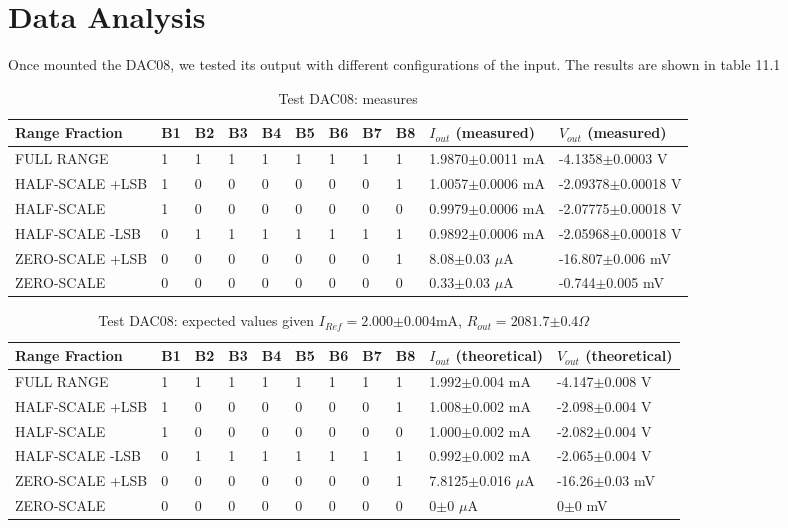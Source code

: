 \section{Data Analysis}
Once mounted the DAC08, we tested its output with different configurations of the input. The results are shown in table 11.1 \\

\begin{table}[H]
\centering
 \begin{tabular}{lllllllllll}
 \toprule
  Range Fraction & B1 & B2 & B3 & B4 & B5 & B6 & B7 & B8 & $I_{out}$ (measured) & $V_{out}$ (measured) \\
 \midrule
  FULL RANGE & 1 & 1 & 1 & 1 & 1 & 1 & 1 & 1 & 1.9870\(\pm\)0.0011 mA & -4.1358\(\pm\)0.0003 V \\
  HALF-SCALE +LSB & 1 & 0 & 0 & 0 & 0 & 0 & 0 & 1 & 1.0057\(\pm\)0.0006 mA & -2.09378\(\pm\)0.00018 V \\
  HALF-SCALE & 1 & 0 & 0 & 0 & 0 & 0 & 0 & 0 & 0.9979\(\pm\)0.0006 mA & -2.07775\(\pm\)0.00018 V \\
  HALF-SCALE  -LSB & 0 & 1 & 1 & 1 & 1 & 1 & 1 & 1 & 0.9892\(\pm\)0.0006 mA & -2.05968\(\pm\)0.00018 V \\
  ZERO-SCALE +LSB & 0 & 0 & 0 & 0 & 0 & 0 & 0 & 1 & 8.08\(\pm\)0.03 \(\mu\)A & -16.807\(\pm\)0.006 mV \\
  ZERO-SCALE & 0 & 0 & 0 & 0 & 0 & 0 & 0 & 0 & 0.33\(\pm\)0.03 \(\mu\)A & -0.744\(\pm\)0.005 mV \\
 \bottomrule
 \end{tabular}
\caption{Test DAC08: measures}
\end{table}  

\begin{table}[H]
\centering
 \begin{tabular}{lllllllllll}
 \toprule
  Range Fraction & B1 & B2 & B3 & B4 & B5 & B6 & B7 & B8 & $I_{out}$ (theoretical) & $V_{out}$ (theoretical)\\
 \midrule
  FULL RANGE & 1 & 1 & 1 & 1 & 1 & 1 & 1 & 1 & 1.992\(\pm\)0.004 mA & -4.147\(\pm\)0.008 V \\
  HALF-SCALE +LSB & 1 & 0 & 0 & 0 & 0 & 0 & 0 & 1 & 1.008\(\pm\)0.002 mA & -2.098\(\pm\)0.004 V \\
  HALF-SCALE & 1 & 0 & 0 & 0 & 0 & 0 & 0 & 0 & 1.000\(\pm\)0.002 mA & -2.082\(\pm\)0.004 V \\
  HALF-SCALE  -LSB & 0 & 1 & 1 & 1 & 1 & 1 & 1 & 1 & 0.992\(\pm\)0.002 mA & -2.065\(\pm\)0.004 V \\
  ZERO-SCALE +LSB & 0 & 0 & 0 & 0 & 0 & 0 & 0 & 1 & 7.8125\(\pm\)0.016 \(\mu\)A & -16.26\(\pm\)0.03 mV \\
  ZERO-SCALE & 0 & 0 & 0 & 0 & 0 & 0 & 0 & 0 & 0\(\pm\)0 \(\mu\)A & 0\(\pm\)0 mV \\
 \bottomrule
 \end{tabular}
\caption{Test DAC08: expected values given $I_{Ref}=2.000$\(\pm\)0.004mA, $R_{out}=2081.7$\(\pm\)0.4\(\Omega\)}
\end{table}  

